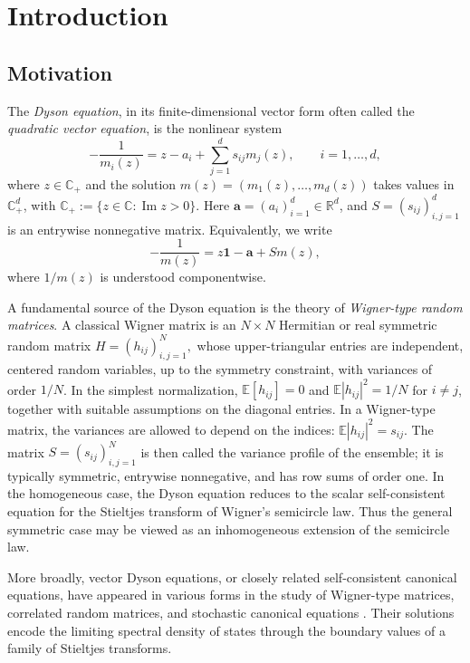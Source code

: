 \documentclass[11pt,twoside, a4paper]{article}
\numberwithin{equation}{section}
\numberwithin{figure}{section}
\theoremstyle{plain} %
\theoremstyle{definition}
\theoremstyle{remark}
\newcommand{\1} {\mspace{1 mu}}
\newcommand{\2} {\mspace{2 mu}}
\begin{document}
\section{Introduction}
\subsection{Motivation}\label{sec.motivation}
The \emph{Dyson equation}, in its finite-dimensional vector form often called the
\emph{quadratic vector equation}, is the nonlinear system
\begin{equation*}
    -\frac{1}{m_i(z)}
    =
    z-a_i+\sum_{j=1}^d s_{ij}m_j(z),
    \qquad i=1,\dots,d,
\end{equation*}
where \(z\in \mathbb C_+\) and the solution
\(m(z)=(m_1(z),\dots,m_d(z))\) takes values in
\(\mathbb C_+^d\), with
$
    \mathbb C_+ := \{z\in \mathbb C:\operatorname{Im} z>0\}$.
Here \(\mathbf a=(a_i)_{i=1}^d\in \mathbb R^d\), and
\(S=(s_{ij})_{i,j=1}^d\) is an entrywise nonnegative matrix. Equivalently, we write
\begin{equation}\label{eq:QVE}
    -\frac1{m(z)}=z\mathbf 1-\mathbf a+Sm(z),
\end{equation}
where \(1/m(z)\) is understood componentwise.

A fundamental source of the Dyson equation is the theory of
\emph{Wigner-type random matrices}. A classical Wigner matrix is an
\(N\times N\) Hermitian or real symmetric random matrix
$
    H=(h_{ij})_{i,j=1}^N,
$
whose upper-triangular entries are independent, centered random variables,
up to the symmetry constraint, with variances of order \(1/N\). In the
simplest normalization,
$    \mathbb E [h_{ij}]=0$
and
    $\mathbb E |h_{ij}|^2=1/N$
   for $i\neq j$,
together with suitable assumptions on the diagonal entries. In a
Wigner-type matrix, the variances are allowed to depend on the indices:
  $  \mathbb E |h_{ij}|^2=s_{ij}.$
The matrix \(S=(s_{ij})_{i,j=1}^N\) is then called the variance profile of
the ensemble; it is typically symmetric, entrywise nonnegative, and has
row sums of order one. In the homogeneous case, the Dyson equation reduces
to the scalar self-consistent equation for the Stieltjes transform of
Wigner's semicircle law. Thus the general symmetric case may be viewed as
an inhomogeneous extension of the semicircle law.

More broadly, vector Dyson equations, or closely related self-consistent
canonical equations, have appeared in various forms in the study of
Wigner-type matrices, correlated random matrices, and stochastic canonical
equations
\cite{Ber1973,Wegner1979,Girko2001,KhorunzhyPastur1994,
Shlyakhtenko1996,Guionnet2002,AndersonZeitouni2005,AndersonZeitouni2008,hachem2006empirical}.
Their solutions encode the limiting spectral density of states through
the boundary values of a family of Stieltjes transforms.
\end{document}
